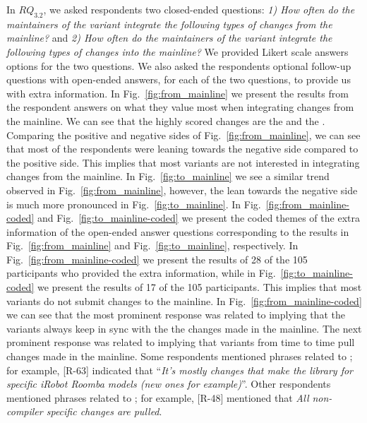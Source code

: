 \nd In $RQ_{3.2}$, we asked respondents two closed-ended questions: \textit{1) How often do the maintainers of the variant integrate the following types of changes from the mainline?} and\textit{ 2) How often do the maintainers of the variant integrate the following types of changes into the mainline?} We provided Likert scale answers options for the two questions. We also asked the respondents optional follow-up questions with open-ended answers, for each of the two questions, to provide us with extra information.
In Fig.~\ref{fig:from_mainline} we present the results from the respondent answers on what they value most when integrating changes from the mainline. We can see that the highly scored changes are the  and the . Comparing the positive and negative sides of Fig.~\ref{fig:from_mainline}, we can see that most of the respondents were leaning towards the negative side compared to the positive side. 
This implies that most variants are not interested in integrating changes from the mainline.
In Fig.~\ref{fig:to_mainline} we see a similar trend observed in Fig.~\ref{fig:from_mainline}, however, the lean towards the negative side is much more pronounced in Fig.~\ref{fig:to_mainline}.
In Fig.~\ref{fig:from_mainline-coded} and Fig.~\ref{fig:to_mainline-coded} we present the coded themes of the extra information of the open-ended answer questions corresponding to the results in Fig.~\ref{fig:from_mainline} and Fig.~\ref{fig:to_mainline}, respectively. In Fig.~\ref{fig:from_mainline-coded} we present the results of 28 of the 105 participants who provided the extra information, while in Fig.~\ref{fig:to_mainline-coded} we present the results of 17 of the 105 participants. 
This implies that most variants do not submit changes to the mainline.
In Fig.~\ref{fig:from_mainline-coded} we can see that the most prominent response was related to  implying that the variants always keep in sync with the the changes made in the mainline. The next prominent response was related to  implying that variants from time to time pull changes made in the mainline. Some respondents mentioned phrases related to ; for example, [R-63] indicated that ``\emph{It's mostly changes that make the library for specific iRobot Roomba models (new ones for example)}''. Other respondents mentioned phrases related to ; for example, [R-48] mentioned that \emph{All non-compiler specific changes are pulled}.
